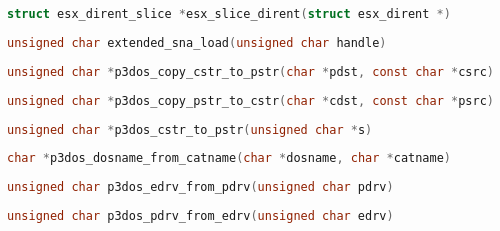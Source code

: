 \documentclass[11pt]{book}
\def\lthtmlcheckvsize{\ifdim\ht\sizebox<\vsize 
  \ifdim\wd\sizebox<\hsize\expandafter\hfill\fi \expandafter\vfill
  \else\expandafter\vss\fi}%
\begin{document}
{\newpage\clearpage
{}%
\begin{lstlisting}[language=C]
struct esx_dirent_slice *esx_slice_dirent(struct esx_dirent *)
\end{lstlisting}%
\lthtmlfigureZ
\lthtmlcheckvsize\clearpage}

{\newpage\clearpage
{}%
\begin{lstlisting}[language=C]
unsigned char extended_sna_load(unsigned char handle)
\end{lstlisting}%
\lthtmlfigureZ
\lthtmlcheckvsize\clearpage}

{\newpage\clearpage
{}%
\begin{lstlisting}[language=C]
unsigned char *p3dos_copy_cstr_to_pstr(char *pdst, const char *csrc)
\end{lstlisting}%
\lthtmlfigureZ
\lthtmlcheckvsize\clearpage}

{\newpage\clearpage
{}%
\begin{lstlisting}[language=C]
unsigned char *p3dos_copy_pstr_to_cstr(char *cdst, const char *psrc)
\end{lstlisting}%
\lthtmlfigureZ
\lthtmlcheckvsize\clearpage}

{\newpage\clearpage
{}%
\begin{lstlisting}[language=C]
unsigned char *p3dos_cstr_to_pstr(unsigned char *s)
\end{lstlisting}%
\lthtmlfigureZ
\lthtmlcheckvsize\clearpage}

{\newpage\clearpage
{}%
\begin{lstlisting}[language=C]
char *p3dos_dosname_from_catname(char *dosname, char *catname)
\end{lstlisting}%
\lthtmlfigureZ
\lthtmlcheckvsize\clearpage}

{\newpage\clearpage
{}%
\begin{lstlisting}[language=C]
unsigned char p3dos_edrv_from_pdrv(unsigned char pdrv)
\end{lstlisting}%
\lthtmlfigureZ
\lthtmlcheckvsize\clearpage}

{\newpage\clearpage
{}%
\begin{lstlisting}[language=C]
unsigned char p3dos_pdrv_from_edrv(unsigned char edrv)
\end{lstlisting}%
\lthtmlfigureZ
\lthtmlcheckvsize\clearpage}
\end{document}
